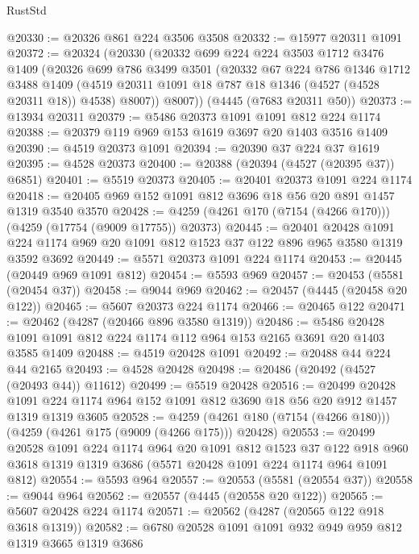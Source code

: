 \begin{lexlean}{RustStd}
\begin{coremodule}
@20330 := @20326 @861 @224 @3506 @3508
@20332 := @15977 @20311 @1091
@20372 := @20324
    (@20330
      (@20332
        @699
        @224
        @224
        @3503
        @1712
        @3476
        @1409
        (@20326
          @699
          @786
          @3499
          @3501
          (@20332
            @67
            @224
            @786
            @1346
            @1712
            @3488
            @1409
            (@4519 @20311 @1091 @18 @787 @18 @1346 (@4527 (@4528 @20311 @18)) @4538)
            @8007))
        @8007))
    (@4445 (@7683 @20311 @50))
@20373 := @13934 @20311
@20379 := @5486 @20373 @1091 @1091 @812 @224 @1174
@20388 := @20379 @119 @969 @153 @1619 @3697 @20 @1403 @3516 @1409
@20390 := @4519 @20373 @1091
@20394 := @20390 @37 @224 @37 @1619
@20395 := @4528 @20373
@20400 := @20388 (@20394 (@4527 (@20395 @37)) @6851)
@20401 := @5519 @20373
@20405 := @20401 @20373 @1091 @224 @1174
@20418 := @20405 @969 @152 @1091 @812 @3696 @18 @56 @20 @891 @1457 @1319 @3540 @3570
@20428 := @4259 (@4261 @170 (@7154 (@4266 @170))) (@4259 (@17754 (@9009 @17755)) @20373)
@20445 := @20401
    @20428
    @1091
    @224
    @1174
    @969
    @20
    @1091
    @812
    @1523
    @37
    @122
    @896
    @965
    @3580
    @1319
    @3592
    @3692
@20449 := @5571 @20373 @1091 @224 @1174
@20453 := @20445 (@20449 @969 @1091 @812)
@20454 := @5593 @969
@20457 := @20453 (@5581 (@20454 @37))
@20458 := @9044 @969
@20462 := @20457 (@4445 (@20458 @20 @122))
@20465 := @5607 @20373 @224 @1174
@20466 := @20465 @122
@20471 := @20462 (@4287 (@20466 @896 @3580 @1319))
@20486 := @5486 @20428 @1091 @1091 @812 @224 @1174 @112 @964 @153 @2165 @3691 @20 @1403 @3585 @1409
@20488 := @4519 @20428 @1091
@20492 := @20488 @44 @224 @44 @2165
@20493 := @4528 @20428
@20498 := @20486 (@20492 (@4527 (@20493 @44)) @11612)
@20499 := @5519 @20428
@20516 := @20499
    @20428
    @1091
    @224
    @1174
    @964
    @152
    @1091
    @812
    @3690
    @18
    @56
    @20
    @912
    @1457
    @1319
    @1319
    @3605
@20528 := @4259 (@4261 @180 (@7154 (@4266 @180))) (@4259 (@4261 @175 (@9009 (@4266 @175))) @20428)
@20553 := @20499
    @20528
    @1091
    @224
    @1174
    @964
    @20
    @1091
    @812
    @1523
    @37
    @122
    @918
    @960
    @3618
    @1319
    @1319
    @3686
    (@5571 @20428 @1091 @224 @1174 @964 @1091 @812)
@20554 := @5593 @964
@20557 := @20553 (@5581 (@20554 @37))
@20558 := @9044 @964
@20562 := @20557 (@4445 (@20558 @20 @122))
@20565 := @5607 @20428 @224 @1174
@20571 := @20562 (@4287 (@20565 @122 @918 @3618 @1319))
@20582 := @6780 @20528 @1091 @1091 @932 @949 @959 @812 @1319 @3665 @1319 @3686

\end{coremodule}
\end{lexlean}
